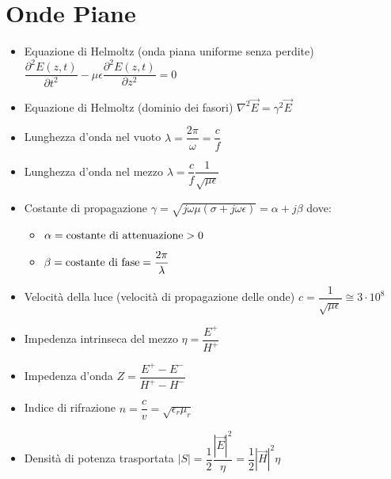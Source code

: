 \documentclass{article}
\begin{document}
\section{Onde Piane}
\begin{itemize}
	\item Equazione di Helmoltz (onda piana uniforme senza perdite) \( \dfrac{\partial^2 E(z, t)}{\partial t^2} - \mu \epsilon \dfrac{\partial^2 E(z, t)}{\partial z^2} = 0\)
	\item Equazione di Helmoltz (dominio dei fasori) \( \nabla^2 \vec{E} = \gamma^2 \vec{E} \)
	\item Lunghezza d'onda nel vuoto \( \lambda = \dfrac{2 \pi}{\omega} = \dfrac{c}{f} \)	
	\item Lunghezza d'onda nel mezzo \( \lambda = \dfrac{c}{f} \dfrac{1}{\sqrt{\mu \epsilon}} \)
	\item Costante di propagazione \( \gamma = \sqrt{j\omega\mu (\sigma + j \omega \epsilon) } = \alpha + j \beta \) dove:
	\begin{itemize}
		\item \( \alpha = \textnormal{costante di attenuazione} > 0\)
		\item \( \beta = \textnormal{costante di fase} = \dfrac{2 \pi}{\lambda} \)
	\end{itemize}
	\item Velocità della luce (velocità di propagazione delle onde) \( c = \dfrac{1}{\sqrt{\mu \epsilon}} \cong 3 \cdot 10^8 \)
	\item Impedenza intrinseca del mezzo \( \eta = \dfrac{E^+}{H^+} \)
	\item Impedenza d'onda \( Z = \dfrac{E^+ - E^-}{H^+ - H^-} \)
	\item Indice di rifrazione \( n = \dfrac{c}{v} = \sqrt{\epsilon_r \mu_r} \)
	\item Densità di potenza trasportata \( |S| = \dfrac{1}{2} \dfrac{|\vec{E}|^2}{\eta} = \dfrac{1}{2} |\vec{H}|^2 \eta \)
\end{itemize}
\end{document}
